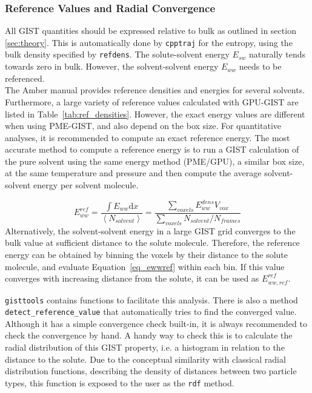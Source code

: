 \documentclass[9pt,tutorial]{livecoms}
\newcommand{\software}{\texttt}
\newcommand\inlinecode{\texttt}
\begin{document}
\subsubsection{Reference Values and Radial Convergence}
All GIST quantities should be expressed relative to bulk as outlined in section \ref{sec:theory}.
This is automatically done by \software{cpptraj} for the entropy, using the bulk density specified by \inlinecode{refdens}.
The solute-solvent energy $E_{sw}$ naturally tends towards zero in bulk.
However, the solvent-solvent energy $E_{ww}$ needs to be referenced.\\
The Amber manual provides reference densities and energies for several solvents.
Furthermore, a large variety of reference values calculated with GPU-GIST are listed in Table~\ref{tab:ref_densities}. 
However, the exact energy values are different when using PME-GIST, and also depend on the box size.
For quantitative analyses, it is recommended to compute an exact reference energy.
The most accurate method to compute a reference energy is to run a GIST calculation of the pure solvent using the same energy method (PME/GPU), a similar box size, at the same temperature and pressure and then compute the average solvent-solvent energy per solvent molecule.

\begin{equation}
\label{eq_ewwref}
E_{ww}^\textit{ref} = \frac{\int{E_{ww}} \mathrm{d}x}{\left<N_\textit{solvent}\right>}
  = \frac{\sum_\textit{voxels}E_{ww}^\textit{dens} V_\textit{vox}}{\sum_\textit{voxels}{N_\textit{solvent}} / N_\textit{frames}}
\end{equation}
Alternatively, the solvent-solvent energy in a large GIST grid converges to the bulk value at sufficient distance to the solute molecule. 
Therefore, the reference energy can be obtained by binning the voxels by their distance to the solute molecule, and evaluate Equation~\ref{eq_ewwref} within each bin.
If this value converges with increasing distance from the solute, it can be used as $E_{ww, ref}^\textit{ref}$.

\software{gisttools} contains functions to facilitate this analysis.
There is also a method \inlinecode{detect\_reference\_value} that automatically tries to find the converged value.
Although it has a simple convergence check built-in, it is always recommended to check the convergence by hand. A handy way to check this is to calculate the radial distribution of this GIST property, i.e. a histogram in relation to the distance to the solute. Due to the conceptual similarity with classical radial distribution functions, describing the density of distances between two particle types, this function is exposed to the user as the \inlinecode{rdf} method.
\end{document}
